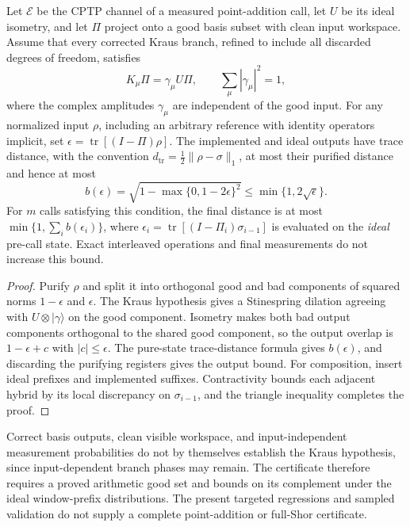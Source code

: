 \begin{proposition}
Let $\mathcal E$ be the CPTP channel of a measured point-addition call, let $U$ be its ideal isometry, and let $\Pi$ project onto a good basis subset with clean input workspace. Assume that every corrected Kraus branch, refined to include all discarded degrees of freedom, satisfies
\[
 K_\mu\Pi=\gamma_\mu U\Pi,
 \qquad \sum_\mu|\gamma_\mu|^2=1,
\]
where the complex amplitudes $\gamma_\mu$ are independent of the good input. For any normalized input $\rho$, including an arbitrary reference with identity operators implicit, set $\epsilon=\operatorname{tr}[(I-\Pi)\rho]$. The implemented and ideal outputs have trace distance, with the convention $d_{\mathrm{tr}}=\tfrac12\|\rho-\sigma\|_1$, at most their purified distance and hence at most
\[
 b(\epsilon)=\sqrt{1-\max\{0,1-2\epsilon\}^2}
 \leq\min\{1,2\sqrt\epsilon\}.
\]
For $m$ calls satisfying this condition, the final distance is at most $\min\{1,\sum_i b(\epsilon_i)\}$, where $\epsilon_i=\operatorname{tr}[(I-\Pi_i)\sigma_{i-1}]$ is evaluated on the \emph{ideal} pre-call state. Exact interleaved operations and final measurements do not increase this bound.
\end{proposition}
\begin{proof}
Purify $\rho$ and split it into orthogonal good and bad components of squared norms $1-\epsilon$ and $\epsilon$. The Kraus hypothesis gives a Stinespring dilation agreeing with $U\otimes|\gamma\rangle$ on the good component. Isometry makes both bad output components orthogonal to the shared good component, so the output overlap is $1-\epsilon+c$ with $|c|\leq\epsilon$. The pure-state trace-distance formula gives $b(\epsilon)$, and discarding the purifying registers gives the output bound. For composition, insert ideal prefixes and implemented suffixes. Contractivity bounds each adjacent hybrid by its local discrepancy on $\sigma_{i-1}$, and the triangle inequality completes the proof.
\end{proof}

Correct basis outputs, clean visible workspace, and input-independent measurement probabilities do not by themselves establish the Kraus hypothesis, since input-dependent branch phases may remain. The certificate therefore requires a proved arithmetic good set and bounds on its complement under the ideal window-prefix distributions. The present targeted regressions and sampled validation do not supply a complete point-addition or full-Shor certificate.
